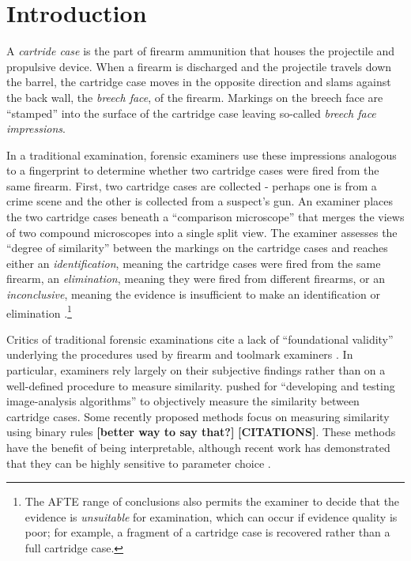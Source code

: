 \documentclass[preprint]{JASA}
\begin{document}




\hypertarget{introduction}{%
\section{Introduction}\label{introduction}}

A \emph{cartride case} is the part of firearm ammunition that houses the
projectile and propulsive device. When a firearm is discharged and the
projectile travels down the barrel, the cartridge case moves in the
opposite direction and slams against the back wall, the \emph{breech
face}, of the firearm. Markings on the breech face are ``stamped'' into
the surface of the cartridge case leaving so-called \emph{breech face
impressions}.

In a traditional examination, forensic examiners use these impressions
analogous to a fingerprint to determine whether two cartridge cases were
fired from the same firearm. First, two cartridge cases are collected -
perhaps one is from a crime scene and the other is collected from a
suspect's gun. An examiner places the two cartridge cases beneath a
``comparison microscope'' that merges the views of two compound
microscopes into a single split view. The examiner assesses the ``degree
of similarity'' between the markings on the cartridge cases and reaches
either an \emph{identification}, meaning the cartridge cases were fired
from the same firearm, an \emph{elimination}, meaning they were fired
from different firearms, or an \emph{inconclusive}, meaning the evidence
is insufficient to make an identification or elimination
\citep{AFTE1992}.\footnote{The AFTE range of conclusions also permits
  the examiner to decide that the evidence is \emph{unsuitable} for
  examination, which can occur if evidence quality is poor; for example,
  a fragment of a cartridge case is recovered rather than a full
  cartridge case.}

Critics of traditional forensic examinations cite a lack of
``foundational validity'' underlying the procedures used by firearm and
toolmark examiners \citep{council_strengthening_2009, pcast2016}. In
particular, examiners rely largely on their subjective findings rather
than on a well-defined procedure to measure similarity.
 pushed for ``developing and testing
image-analysis algorithms'' to objectively measure the similarity
between cartridge cases. Some recently proposed methods focus on
measuring similarity using binary rules \textbf{{[}better way to say
that?{]}} \textbf{{[}CITATIONS{]}}. These methods have the benefit of
being interpretable, although recent work has demonstrated that they can
be highly sensitive to parameter choice \citep{Zemmels2023}.
\end{document}
